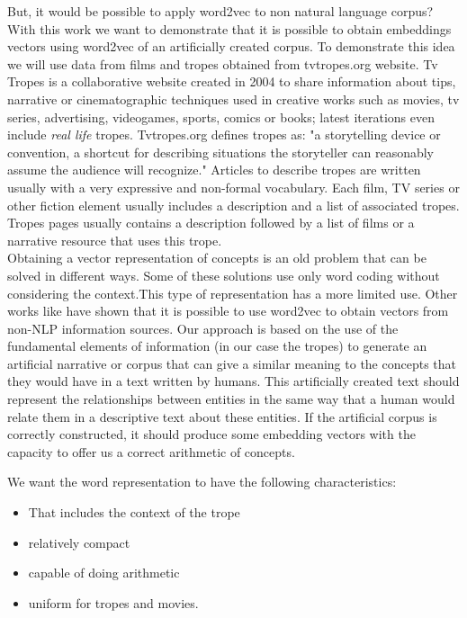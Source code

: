 \documentclass[letterpaper]{article}
\begin{document}
    But, it would be possible to apply word2vec to non natural language corpus? With this work we want to demonstrate that it is possible to obtain embeddings vectors using word2vec of an artificially created corpus. To demonstrate this idea we will use data from films and tropes obtained from tvtropes.org website. Tv Tropes is a collaborative website created in 2004 to share information about tips, narrative or cinematographic techniques used in creative works such as movies, tv series, advertising,
    videogames, sports, comics or books; latest iterations even include {\em real life} tropes. Tvtropes.org defines tropes as:
    "a storytelling device or convention, a shortcut for describing
    situations the storyteller can reasonably assume the audience will
    recognize." Articles to describe tropes are written usually with a very
    expressive and non-formal vocabulary. Each film, TV series or other
    fiction element usually includes a description and a list of associated
    tropes. Tropes pages usually contains a description followed by a list
    of films or a narrative resource that uses this trope.\\
    
	
	Obtaining a vector representation of concepts is an old problem that can be solved in different ways. Some of these solutions use only word coding without considering the context.This type of representation has a more limited use. Other works like \cite{kazama2018} have shown that it is
	possible to use word2vec to obtain vectors from non-NLP information
	sources. Our approach is based on the use of the fundamental elements
	of information (in our case the tropes) to generate an artificial
	narrative or corpus that can give a similar meaning to the concepts
	that they would have in a text written by humans. This artificially
	created text should represent the relationships between entities in
	the same way that a human would relate them in a descriptive text
	about these entities. If the artificial corpus is correctly
	constructed, it should produce some embedding vectors with the
	capacity to offer us a correct arithmetic of concepts. 
	
	We want the word representation to have the following characteristics: 
	
	\begin{itemize}

	\item That includes the context of the trope
	\item relatively compact
	\item capable of doing arithmetic
	\item uniform for tropes and movies.
		
    \end{itemize}
	   
\end{document}
